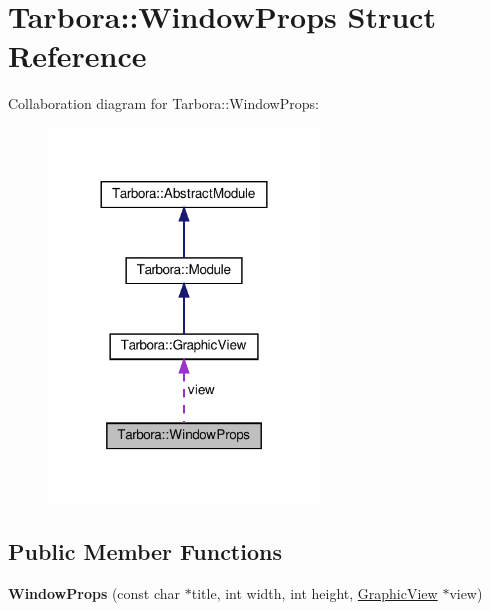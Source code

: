 \hypertarget{structTarbora_1_1WindowProps}{}\section{Tarbora\+:\+:Window\+Props Struct Reference}
\label{structTarbora_1_1WindowProps}


Collaboration diagram for Tarbora\+:\+:Window\+Props\+:
\nopagebreak
\begin{figure}[H]
\begin{center}
\leavevmode
\includegraphics[width=204pt]{structTarbora_1_1WindowProps__coll__graph}
\end{center}
\end{figure}
\subsection*{Public Member Functions}
\begin{DoxyCompactItemize}
\item 
\mbox{\label{structTarbora_1_1WindowProps_a25ce56553ad0bb6c7764817242592472}} 
{\bfseries Window\+Props} (const char $\ast$title, int width, int height, \hyperlink{classTarbora_1_1GraphicView}{Graphic\+View} $\ast$view)
\end{DoxyCompactItemize}
